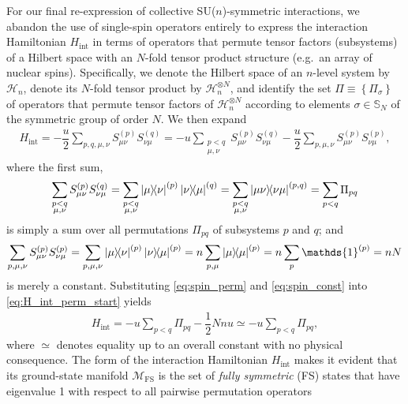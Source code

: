 \documentclass[nofootinbib,notitlepage,11pt]{revtex4-2}
\renewcommand{\t}{\text} %
\newcommand{\f}[2]{\dfrac{#1}{#2}} %
\renewcommand{\set}[1]{\left\{#1\right\}} %
\newcommand{\1}{\mathds{1}}
\renewcommand{\H}{\mathcal{H}}
\newcommand{\M}{\mathcal{M}}
\renewcommand{\SS}{\mathbb{S}}
\newcommand{\FS}{\text{FS}}
\begin{document}
For our final re-expression of collective SU($n$)-symmetric
interactions, we abandon the use of single-spin operators entirely to
express the interaction Hamiltonian $H_{\t{int}}$ in terms of
operators that permute tensor factors (subsystems) of a Hilbert space
with an $N$-fold tensor product structure (e.g.~an array of nuclear
spins).  Specifically, we denote the Hilbert space of an $n$-level
system by $\H_n$, denote its $N$-fold tensor product by
$\H_n^{\otimes N}$, and identify the set $\Pi\equiv\set{\Pi_\sigma}$
of operators that permute tensor factors of $\H_n^{\otimes N}$
according to elements $\sigma\in\SS_N$ of the symmetric group of order
$N$.  We then expand
\begin{align}
  H_{\t{int}}
  = -\f{u}{2} \sum_{p,q,\mu,\nu} S_{\mu\nu}^{(p)} S_{\nu\mu}^{(q)}
  = -u\sum_{\substack{p<q\\\mu,\nu}} S_{\mu\nu}^{(p)} S_{\nu\mu}^{(q)}
  - \f{u}{2} \sum_{p,\mu,\nu} S_{\mu\nu}^{(p)} S_{\nu\mu}^{(p)},
  \label{eq:H_int_perm_start}
\end{align}
where the first sum,
\begin{align}
  \sum_{\substack{p<q\\\mu,\nu}} S_{\mu\nu}^{(p)} S_{\nu\mu}^{(q)}
  = \sum_{\substack{p<q\\\mu,\nu}} \op{\mu}{\nu}^{(p)} \op{\nu}{\mu}^{(q)}
  = \sum_{\substack{p<q\\\mu,\nu}} \op{\mu\nu}{\nu\mu}^{(p,q)}
  = \sum_{p<q} \Pi_{pq}
  \label{eq:spin_perm}
\end{align}
is simply a sum over all permutations $\Pi_{pq}$ of subsystems $p$ and
$q$; and
\begin{align}
  \sum_{p,\mu,\nu} S_{\mu\nu}^{(p)} S_{\nu\mu}^{(p)}
  = \sum_{p,\mu,\nu} \op{\mu}{\nu}^{(p)} \op{\nu}{\mu}^{(p)}
  = n \sum_{p,\mu} \op{\mu}{\mu}^{(p)}
  = n \sum_p \1^{(p)}
  = n N
  \label{eq:spin_const}
\end{align}
is merely a constant.  Substituting \eqref{eq:spin_perm} and
\eqref{eq:spin_const} into \eqref{eq:H_int_perm_start} yields
\begin{align}
  H_{\t{int}} = -u \sum_{p<q} \Pi_{pq} - \f12 N n u
  \simeq -u\sum_{p<q} \Pi_{pq},
  \label{eq:H_int_perm}
\end{align}
where $\simeq$ denotes equality up to an overall constant with no
physical consequence.  The form of the interaction Hamiltonian
$H_{\t{int}}$ makes it evident that its ground-state manifold
$\M_{\FS}$ is the set of {\it fully symmetric} (FS) states that have
eigenvalue 1 with respect to all pairwise permutation operators
\end{document}
